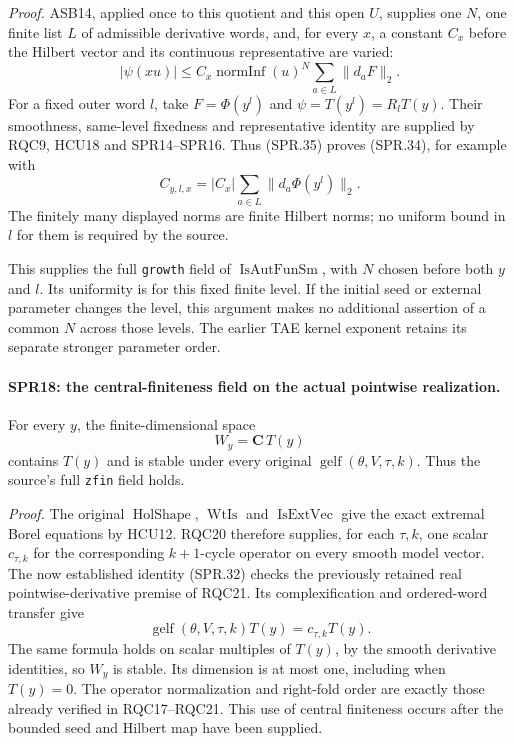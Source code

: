 \documentclass[11pt,a4paper]{article}
\numberwithin{equation}{section}
\theoremstyle{remark}\newtheorem{remark}[theorem]{Remark}
\begin{document}
\emph{Proof.}
ASB14, applied once to this quotient and this open \(U\), supplies
one \(N\), one finite list \(L\) of admissible derivative words,
and, for every \(x\), a constant \(C_x\) before the Hilbert vector
and its continuous representative are varied:
\[
 |\psi(xu)|
 \le C_x\operatorname{normInf}(u)^N
                           \sum_{a\in L}\|d_aF\|_2.
 \tag{SPR.35}
\]
For a fixed outer word \(l\), take
\(F=\Phi(y^l)\) and \(\psi=T(y^l)=R_lT(y)\).
Their smoothness, same-level fixedness and representative identity
are supplied by RQC9, HCU18 and SPR14--SPR16.
Thus (SPR.35) proves (SPR.34), for example with
\[
                  C_{y,l,x}
                  =|C_x|\sum_{a\in L}\|d_a\Phi(y^l)\|_2.
\]
The finitely many displayed norms are finite Hilbert norms;
no uniform bound in \(l\) for them is required by the source.

This supplies the full \texttt{growth} field of
\(\operatorname{IsAutFunSm}\), with \(N\) chosen before both
\(y\) and \(l\).
Its uniformity is for this fixed finite level.  If the initial
seed or external parameter changes the level, this argument
makes no additional assertion of a common \(N\) across those
levels.  The earlier TAE kernel exponent retains its separate
stronger parameter order.

\paragraph{SPR18: the central-finiteness field on the actual pointwise realization.}
\label{claim:SPR18}
For every \(y\), the finite-dimensional space
\[
                         W_y=\mathbf C\,T(y)
 \tag{SPR.36}
\]
contains \(T(y)\) and is stable under every original
\(\operatorname{gelf}(\theta,V,\tau,k)\).
Thus the source's full \texttt{zfin} field holds.

\emph{Proof.}
The original \(\operatorname{HolShape}\),
\(\operatorname{WtIs}\) and \(\operatorname{IsExtVec}\)
give the exact extremal Borel equations by HCU12.
RQC20 therefore supplies, for each \(\tau,k\), one scalar
\(c_{\tau,k}\) for the corresponding \(k+1\)-cycle operator on
every smooth model vector.
The now established identity (SPR.32) checks the previously
retained real pointwise-derivative premise of RQC21.
Its complexification and ordered-word transfer give
\[
             \operatorname{gelf}(\theta,V,\tau,k)T(y)
                          =c_{\tau,k}T(y).
\]
The same formula holds on scalar multiples of \(T(y)\), by
the smooth derivative identities, so \(W_y\) is stable.
Its dimension is at most one, including when \(T(y)=0\).
The operator normalization and right-fold order are exactly
those already verified in RQC17--RQC21.
This use of central finiteness occurs after the bounded seed
and Hilbert map have been supplied.
\end{document}
